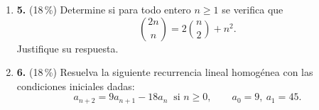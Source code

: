 \documentclass[11pt]{article}
\begin{document}
\begin{enumerate}
\item[]\textbf{5.} (18\,\%) Determine si para todo entero $n \geq 1$ se verifica que
\[
\binom{2n}{n} = 2\binom{n}{2} + n^2.
\]
Justifique su respuesta.

\item[]\textbf{6.} (18\,\%) Resuelva la siguiente recurrencia lineal homogénea con las condiciones iniciales dadas:
\[
a_{n+2} = 9 a_{n+1} - 18 a_n \ \text{ si } n \geq 0, \qquad a_0 = 9,\ a_1 = 45.
\]
\end{enumerate}

\vfill
{}
\end{document}
